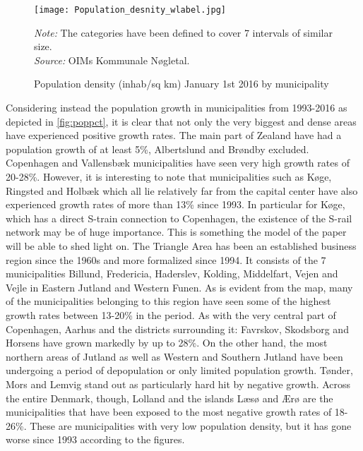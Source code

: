 \begin{figure}
\centering
\begin{minipage}{0.55\textwidth}
\texttt{[image: Population\_desnity\_wlabel.jpg]} 
{\tiny \emph{Note:} The categories have been defined to cover 7 intervals of similar size. \\ \emph{Source:} OIMs Kommunale Nøgletal. \par}
\end{minipage}
\caption{Population density (inhab/sq km) January 1st 2016 by municipality}
\label{fig:popdens}
\end{figure}

Considering instead the population growth in municipalities from 1993-2016 as depicted in \autoref{fig:poppct}, it is clear that not only the very biggest and dense areas have experienced positive growth rates. The main part of Zealand have had a population growth of at least 5\%, Albertslund and Brøndby excluded. Copenhagen and Vallensbæk municipalities have seen very high growth rates of 20-28\%. However, it is interesting to note that municipalities such as Køge, Ringsted and Holbæk which all lie relatively far from the capital center have also experienced growth rates of more than 13\% since 1993. In particular for Køge, which has a direct S-train connection to Copenhagen, the existence of the S-rail network may be of huge importance. This is something the model of the paper will be able to shed light on. The Triangle Area has been an established business region since the 1960s and more formalized since 1994. It consists of the 7 municipalities Billund, Fredericia, Haderslev, Kolding, Middelfart, Vejen and Vejle in Eastern Jutland and Western Funen. As is evident from the map, many of the municipalities belonging to this region have seen some of the highest growth rates between 13-20\% in the period. As with the very central part of Copenhagen, Aarhus and the districts surrounding it: Favrskov, Skodsborg and Horsens have grown markedly by up to 28\%. On the other hand, the most northern areas of Jutland as well as Western and Southern Jutland have been undergoing a period of depopulation or only limited population growth. Tønder, Mors and Lemvig stand out as particularly hard hit by negative growth. Across the entire Denmark, though, Lolland and the islands Læsø and Ærø are the municipalities that have been exposed to the most negative growth rates of 18-26\%. These are municipalities with very low population density, but it has gone worse since 1993 according to the figures. 

